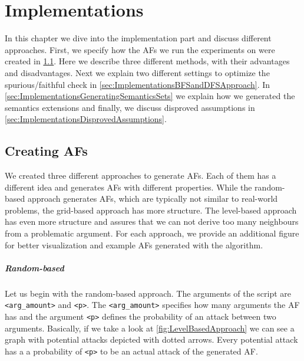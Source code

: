 \chapter{Implementations}
In this chapter we dive into the implementation part and discuss different approaches. First, we specify how the AFs we run the experiments on were created in \cref{sec:ImplementationsCreatingAFs}. Here we describe three different methods, with their advantages and disadvantages. Next we explain two different settings to optimize the spurious/faithful check in \cref{sec:ImplementationsBFSandDFSApproach}. In \cref{sec:ImplementationsGeneratingSemanticsSets} we explain how we generated the semantics extensions and finally, we discuss disproved assumptions in \cref{sec:ImplementationsDisprovedAssumptions}.

\section{Creating AFs}
\label{sec:ImplementationsCreatingAFs}
We created three different approaches to generate AFs. Each of them has a different idea and generates AFs with different properties. While the random-based approach generates AFs, which are typically not similar to real-world problems, the grid-based approach has more structure. The level-based approach has even more structure and assures that we can not derive too many neighbours from a problematic argument. For each approach, we provide an additional figure for better visualization and example AFs generated with the algorithm.

\paragraph{Random-based} Let us begin with the random-based approach. The arguments of the script are \texttt{<arg\_amount>} and \texttt{<p>}. The \texttt{<arg\_amount>} specifies how many arguments the AF has and the argument \texttt{<p>} defines the probability of an attack between two arguments. Basically, if we take a look at \cref{fig:LevelBasedApproach} we can see a graph with potential attacks depicted with dotted arrows. Every potential attack has a a probability of \texttt{<p>} to be an actual attack of the generated AF.



